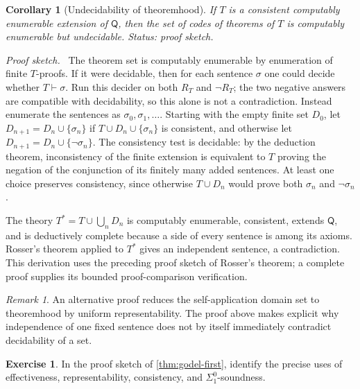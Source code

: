 \documentclass[11pt,oneside,openany]{book}
\theoremstyle{definition}
\newtheorem{exercise}[definition]{Exercise}
\theoremstyle{plain}
\newtheorem{corollary}[definition]{Corollary}
\theoremstyle{remark}
\newtheorem{remark}[definition]{Remark}
\newenvironment{proofplan}{\par\noindent\textit{Proof sketch.}\ }{\par}
\newcommand{\derives}{\vdash}
\begin{document}
\begin{corollary}[Undecidability of theoremhood]
If \(T\) is a consistent computably enumerable extension of \(\mathsf Q\),
then the set of codes of theorems of \(T\) is computably enumerable but
undecidable.
\textit{Status: proof sketch.}
\end{corollary}

\begin{proofplan}
The theorem set is computably enumerable by enumeration of finite \(T\)-proofs.  If it were
decidable, then for each sentence \(\sigma\) one could decide whether
\(T\derives\sigma\).  Run this decider on both \(R_T\) and \(\neg R_T\); the
two negative answers are compatible with decidability, so this alone is not a
contradiction.  Instead enumerate the sentences as
\(\sigma_0,\sigma_1,\ldots\).  Starting with the empty finite set \(D_0\), let
\(D_{n+1}=D_n\cup\{\sigma_n\}\) if \(T\cup D_n\cup\{\sigma_n\}\) is
consistent, and otherwise let
\(D_{n+1}=D_n\cup\{\neg\sigma_n\}\).  The consistency test is decidable:
by the deduction theorem, inconsistency of the finite extension is equivalent
to \(T\) proving the negation of the conjunction of its finitely many added
sentences.  At least one choice preserves consistency, since otherwise
\(T\cup D_n\) would prove both \(\sigma_n\) and \(\neg\sigma_n\).

The theory \(T^*=T\cup\bigcup_nD_n\) is computably enumerable, consistent, extends
\(\mathsf Q\), and is deductively complete because a side of every sentence
is among its axioms.  Rosser's theorem applied to \(T^*\) gives an independent
sentence, a contradiction.
This derivation uses the preceding proof sketch of Rosser's theorem; a complete
proof supplies its bounded proof-comparison verification.
\end{proofplan}

\begin{remark}
An alternative proof reduces the self-application domain set to theoremhood by uniform
representability.  The proof above makes explicit why independence of one
fixed sentence does not by itself immediately contradict decidability of a
set.
\end{remark}

\begin{exercise}
\label{ex:first-incompleteness-01}
In the proof sketch of \cref{thm:godel-first}, identify the precise uses of
effectiveness, representability, consistency, and \(\Sigma^0_1\)-soundness.
\end{exercise}
\end{document}
